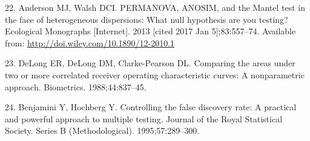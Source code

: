 \documentclass[12pt,]{article}
\begin{document}
\hypertarget{ref-anderson_permanova_2013}{}
22. Anderson MJ, Walsh DCI. PERMANOVA, ANOSIM, and the Mantel test in
the face of heterogeneous dispersions: What null hypothesis are you
testing? Ecological Monographs {[}Internet{]}. 2013 {[}cited 2017 Jan
5{]};83:557--74. Available from:
\url{http://doi.wiley.com/10.1890/12-2010.1}

\hypertarget{ref-delong_comparing_1988}{}
23. DeLong ER, DeLong DM, Clarke-Pearson DL. Comparing the areas under
two or more correlated receiver operating characteristic curves: A
nonparametric approach. Biometrics. 1988;44:837--45.

\hypertarget{ref-benjamini_controlling_1995}{}
24. Benjamini Y, Hochberg Y. Controlling the false discovery rate: A
practical and powerful approach to multiple testing. Journal of the
Royal Statistical Society. Series B (Methodological). 1995;57:289--300.
\end{document}
